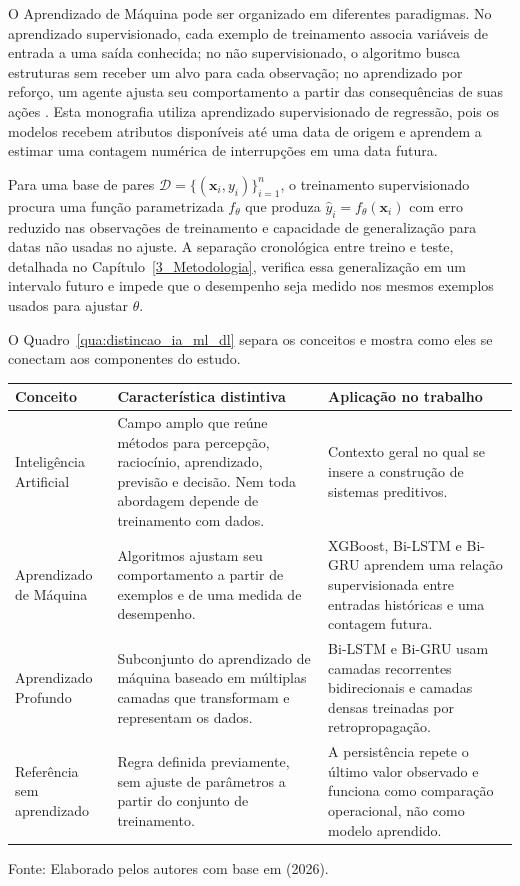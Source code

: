 O Aprendizado de Máquina pode ser organizado em diferentes paradigmas. No aprendizado supervisionado, cada exemplo de treinamento associa variáveis de entrada a uma saída conhecida; no não supervisionado, o algoritmo busca estruturas sem receber um alvo para cada observação; no aprendizado por reforço, um agente ajusta seu comportamento a partir das consequências de suas ações \cite{russell2021artificial,mitchell1997machine}. Esta monografia utiliza aprendizado supervisionado de regressão, pois os modelos recebem atributos disponíveis até uma data de origem e aprendem a estimar uma contagem numérica de interrupções em uma data futura.

Para uma base de pares $\mathcal{D}=\{(\mathbf{x}_i,y_i)\}_{i=1}^{n}$, o treinamento supervisionado procura uma função parametrizada $f_{\theta}$ que produza $\widehat{y}_i=f_{\theta}(\mathbf{x}_i)$ com erro reduzido nas observações de treinamento e capacidade de generalização para datas não usadas no ajuste. A separação cronológica entre treino e teste, detalhada no Capítulo~\ref{3_Metodologia}, verifica essa generalização em um intervalo futuro e impede que o desempenho seja medido nos mesmos exemplos usados para ajustar $\theta$.

O Quadro~\ref{qua:distincao_ia_ml_dl} separa os conceitos e mostra como eles se conectam aos componentes do estudo.

\begin{quadro}[H]
\caption{Distinção entre os conceitos e sua aplicação nesta monografia}
\label{qua:distincao_ia_ml_dl}
\begin{center}
\small
\begin{tabularx}{\textwidth}{p{3.2cm} X X}
\toprule
\textbf{Conceito} & \textbf{Característica distintiva} & \textbf{Aplicação no trabalho} \\
\midrule
Inteligência Artificial & Campo amplo que reúne métodos para percepção, raciocínio, aprendizado, previsão e decisão. Nem toda abordagem depende de treinamento com dados. & Contexto geral no qual se insere a construção de sistemas preditivos. \\
Aprendizado de Máquina & Algoritmos ajustam seu comportamento a partir de exemplos e de uma medida de desempenho. & XGBoost, Bi-LSTM e Bi-GRU aprendem uma relação supervisionada entre entradas históricas e uma contagem futura. \\
Aprendizado Profundo & Subconjunto do aprendizado de máquina baseado em múltiplas camadas que transformam e representam os dados. & Bi-LSTM e Bi-GRU usam camadas recorrentes bidirecionais e camadas densas treinadas por retropropagação. \\
Referência sem aprendizado & Regra definida previamente, sem ajuste de parâmetros a partir do conjunto de treinamento. & A persistência repete o último valor observado e funciona como comparação operacional, não como modelo aprendido. \\
\bottomrule
\end{tabularx}
\normalsize
\end{center}
\small{Fonte: Elaborado pelos autores com base em \cite{lecun2015deep,jordan2015machine,mitchell1997machine} (2026).}
\end{quadro}

